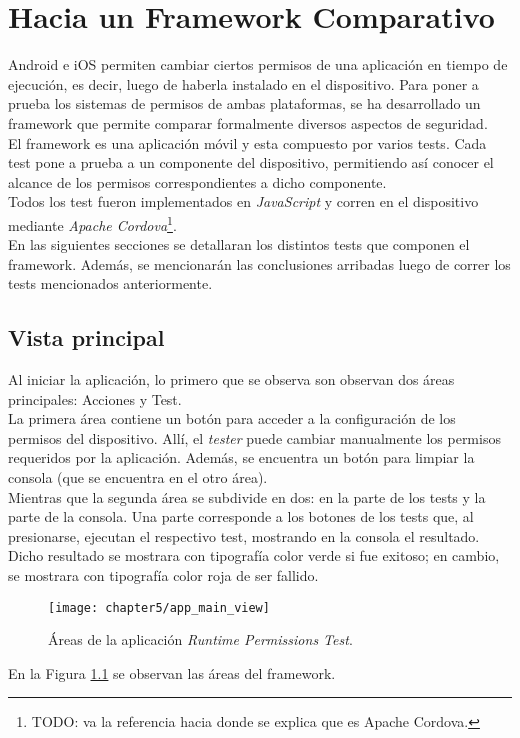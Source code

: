 \chapter{Hacia un Framework Comparativo}
Android e iOS permiten cambiar ciertos permisos de una aplicación en tiempo de ejecución, es decir, luego de haberla instalado en el dispositivo. Para poner a prueba los sistemas de permisos de ambas plataformas, se ha desarrollado un framework que permite comparar formalmente diversos aspectos de seguridad.\\
El framework es una aplicación móvil y esta compuesto por varios tests. Cada test pone a prueba a un componente del dispositivo, permitiendo así conocer el alcance de los permisos correspondientes a dicho componente.\\
Todos los test fueron implementados en \emph{JavaScript} y corren en el dispositivo mediante \emph{Apache Cordova}\footnote{TODO: va la referencia hacia donde se explica que es Apache Cordova.}.\\
En las siguientes secciones se detallaran los distintos tests que componen el framework. Además, se mencionarán las conclusiones arribadas luego de correr los tests mencionados anteriormente.
\section{Vista principal}
Al iniciar la aplicación, lo primero que se observa son observan dos áreas principales: Acciones y Test.\\
La primera área contiene un botón para acceder a la configuración de los permisos del dispositivo. Allí, el \textit{tester} puede cambiar manualmente los permisos requeridos por la aplicación. Además, se encuentra un botón para limpiar la consola (que se encuentra en el otro área).\\
Mientras que la segunda área se subdivide en dos: en la parte de los tests y la parte de la consola. Una parte corresponde a los botones de los tests que, al presionarse, ejecutan el respectivo test, mostrando en la consola el resultado. Dicho resultado se mostrara con tipografía color verde si fue exitoso; en cambio, se mostrara con tipografía color roja de ser fallido.\\
\begin{figure}[hbtp]
    \centering
	\texttt{[image: chapter5/app\_main\_view]}
	\caption{Áreas de la aplicación \textit{Runtime Permissions Test}.}
	\label{fig:chapter05:main_view}
\end{figure}
En la Figura \ref{fig:chapter05:main_view} se observan las áreas del framework.\\

